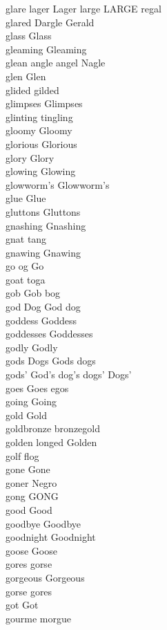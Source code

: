glare lager Lager large LARGE regal\\
glared Dargle Gerald\\
glass Glass\\
gleaming Gleaming\\
glean angle angel Nagle\\
glen Glen\\
glided gilded\\
glimpses Glimpses\\
glinting tingling\\
gloomy Gloomy\\
glorious Glorious\\
glory Glory\\
glowing Glowing\\
glowworm's Glowworm's\\
glue Glue\\
gluttons Gluttons\\
gnashing Gnashing\\
gnat tang\\
gnawing Gnawing\\
go og Go\\
goat toga\\
gob Gob bog\\
god Dog God dog\\
goddess Goddess\\
goddesses Goddesses\\
godly Godly\\
gods Dogs Gods dogs\\
gods' God's dog's dogs' Dogs'\\
goes Goes egos\\
going Going\\
gold Gold\\
goldbronze bronzegold\\
golden longed Golden\\
golf flog\\
gone Gone\\
goner Negro\\
gong GONG\\
good Good\\
goodbye Goodbye\\
goodnight Goodnight\\
goose Goose\\
gores gorse\\
gorgeous Gorgeous\\
gorse gores\\
got Got\\
gourme morgue\\
